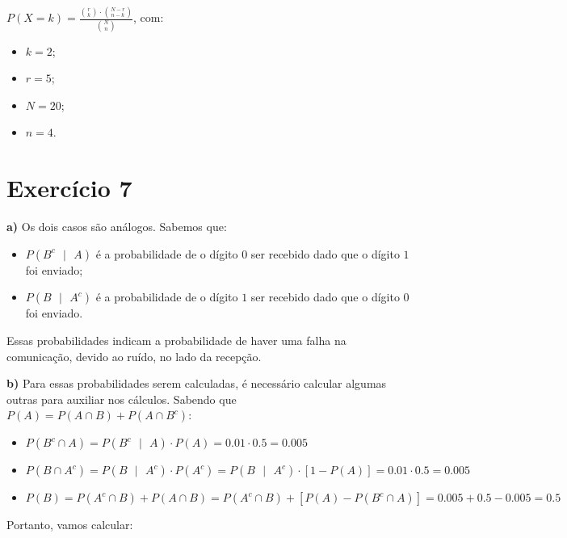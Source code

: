 \documentclass[12pt,letterpaper]{article}
\begin{document}
	\begin{center}
		$P(X=k)=\frac{\binom{r}{k} \cdot \binom{N-r}{n-k}}{\binom{N}{n}}$, com:
	\end{center}
	
	\begin{multicols}{4}
		\begin{itemize}
			\item $k = 2$;
			\item $r = 5$;
			\item $N = 20$;
			\item $n = 4$.
		\end{itemize}
	\end{multicols}
	
	\section*{Exercício 7}
	
	\textbf{a)} Os dois casos são análogos. Sabemos que:
	
	\begin{itemize}
		\item $P(B^c\text{ }|\text{ }A)$ é a probabilidade de o dígito $0$ ser recebido dado que o dígito $1$ foi enviado;
		\item $P(B\text{ }|\text{ }A^c)$ é a probabilidade de o dígito $1$ ser recebido dado que o dígito $0$ foi enviado.
	\end{itemize}
	
	Essas probabilidades indicam a probabilidade de haver uma falha na comunicação, devido ao ruído, no lado da recepção.
	
	\textbf{b)} Para essas probabilidades serem calculadas, é necessário calcular algumas outras para auxiliar nos cálculos. Sabendo que $P(A) = P(A \cap B) + P(A \cap B^c)$:
	
	\begin{itemize}
		\item $P(B^c \cap A) = P(B^c\text{ }|\text{ }A) \cdot P(A) = 0.01 \cdot 0.5 = 0.005$
		\item $P(B \cap A^c) = P(B\text{ }|\text{ }A^c) \cdot P(A^c) = P(B\text{ }|\text{ }A^c) \cdot [1-P(A)] = 0.01 \cdot 0.5 = 0.005$
		\item $P(B) = P(A^c \cap B) + P(A \cap B) = P(A^c \cap B) + [P(A) - P(B^c \cap A)] = 0.005 + 0.5 - 0.005 = 0.5$
	\end{itemize}
	
	Portanto, vamos calcular:
	
\end{document}
